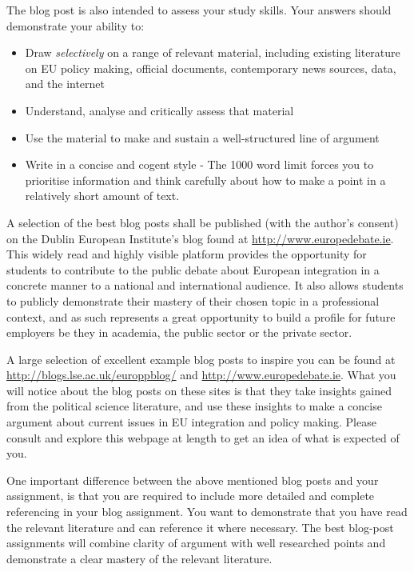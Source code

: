 The blog post is also intended to assess your study skills. Your answers should demonstrate your ability to:

\begin{itemize}
	\item Draw \textit{selectively} on a range of relevant material, including existing literature on EU policy making, official documents, contemporary news sources, data, and the internet
	\item Understand, analyse and critically assess that material
	\item Use the material to make and sustain a well-structured line of argument
	\item Write in a concise and cogent style - The 1000 word limit forces you to prioritise information and think carefully about how to make a point in a relatively short amount of text.
\end{itemize}

	A selection of the best blog posts shall be published (with the author's consent) on the Dublin European Institute's blog found at \url{http://www.europedebate.ie}. This widely read and highly visible platform provides the opportunity for students to contribute to the public debate about European integration in a concrete manner to a national and international audience. It also allows students to publicly demonstrate their mastery of their chosen topic in a professional context, and as such represents a great opportunity to build a profile for future employers be they in academia, the public sector or the private sector. 

	A large selection of excellent example blog posts to inspire you can be found at \url{http://blogs.lse.ac.uk/europpblog/} and \url{http://www.europedebate.ie}. What you will notice about the blog posts on these sites is that they take insights gained from the political science literature, and use these insights to make a concise argument about current issues in EU integration and policy making. Please consult and explore this webpage at length to get an idea of what is expected of you.

	One important difference between the above mentioned blog posts and your assignment, is that you are required to include more detailed and complete referencing in your blog assignment. You want to demonstrate that you have read the relevant literature and can reference it where necessary. The best blog-post assignments will combine clarity of argument with well researched points and demonstrate a clear mastery of the relevant literature.

